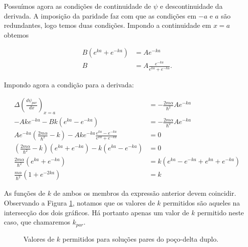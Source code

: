 \documentclass[a4paper, 12pt, notitlepage]{article}
\begin{document}
\begin{enumerate}
\begin{enumerate}
    Possuímos agora as condições de continuidade de $\psi$ e descontinuidade da derivada. A imposição da paridade faz com que as condições em $-a$ e $a$ são redundantes, logo temos duas condições. Impondo a continuidade em $x = a$ obtemos
    
    \begin{align*}
    B \left(e^{ka} + e^{-ka}\right) &= A e^{-ka} \\
    B &= A \frac{e^{-ka}}{e^{ka} + e^{-ka}}.
    \end{align*}
    
    Impondo agora a condição para a derivada:
    
    \begin{align*}
    \Delta\left( \frac{d \psi_{par}}{dx} \right)_{x = a} &= -\frac{2m\alpha}{\hbar^2} Ae^{-ka} \\
    -Ak e^{-ka} - Bk \left(e^{ka} - e^{-ka}\right) &= -\frac{2m\alpha}{\hbar^2} Ae^{-ka} \\
    Ae^{-ka} \left(\frac{2m\alpha}{\hbar^2} - k \right) - Ak e^{-ka}\frac{e^{ka} - e^{-ka}}{e^{ka} + e^{-ka}} &= 0 \\
    \left(\frac{2m\alpha}{\hbar^2} - k \right)\left(e^{ka} + e^{-ka}\right) - k\left(e^{ka} - e^{-ka}\right) &= 0  \\
    \frac{2m\alpha}{\hbar^2}\left(e^{ka} + e^{-ka}\right) &= k \left(e^{ka} - e^{-ka} + e^{ka} + e^{-ka}\right) \\
    \frac{m\alpha}{\hbar^2} \left(1 + e^{-2ka}\right) &= k
    \end{align*}

    As funções de $k$ de ambos os membros da expressão anterior devem coincidir. Observando a Figura \ref{fig:k.par}, notamos que os valores de $k$ permitidos são aqueles na intersecção dos dois gráficos. Há portanto apenas um valor de $k$ permitido neste caso, que chamaremos $k_{par}$.
    
    \begin{figure}[!h]
    \centering
	  \caption{Valores de $k$ permitidos para soluções pares do poço-delta duplo.}
	  \label{fig:k.par}
    \end{figure}
    

\end{enumerate}
\end{enumerate}
\end{document}

